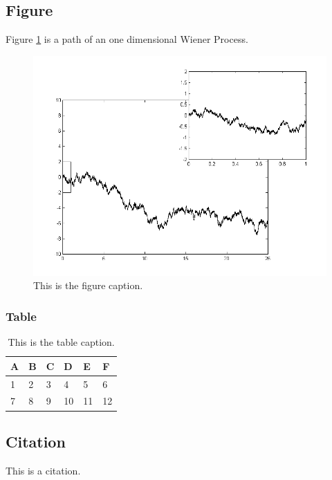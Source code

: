\documentclass{article}
\begin{document}
\subsection{Figure}

Figure \ref{fig1} is a path of an one dimensional Wiener Process.

\begin{figure}[htbp]
	\centering
	\includegraphics[width=0.7\linewidth]{Wiener_process_zoom}
	\caption{This is the figure caption.}
	\label{fig1}
\end{figure}

\subsubsection{Table}

\begin{table}[htbp]
	\centering
	\begin{tabular}{l|lllll}
		\hline
		A & B & C & D & E  & F \\ \hline
		1 & 2 & 3 & 4 & 5  & 6 \\
		7 & 8 & 9 & 10 & 11 & 12 \\ \hline
	\end{tabular}
	\caption{This is the table caption.}
\end{table}

\subsection{Citation}

This is a citation\cite{Silver2016Mastering}.






\end{document}
